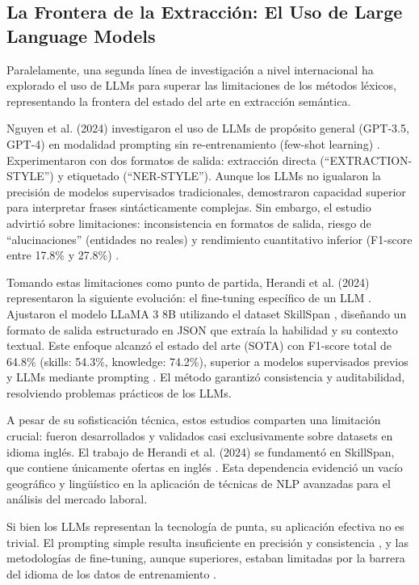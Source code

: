 \subsection{La Frontera de la Extracción: El Uso de Large Language Models}

Paralelamente, una segunda línea de investigación a nivel internacional ha explorado el uso de LLMs para superar las limitaciones de los métodos léxicos, representando la frontera del estado del arte en extracción semántica.

Nguyen et al. (2024) investigaron el uso de LLMs de propósito general (GPT-3.5, GPT-4) en modalidad prompting sin re-entrenamiento (few-shot learning) \cite{nguyen2024}. Experimentaron con dos formatos de salida: extracción directa (``EXTRACTION-STYLE'') y etiquetado (``NER-STYLE''). Aunque los LLMs no igualaron la precisión de modelos supervisados tradicionales, demostraron capacidad superior para interpretar frases sintácticamente complejas. Sin embargo, el estudio advirtió sobre limitaciones: inconsistencia en formatos de salida, riesgo de ``alucinaciones'' (entidades no reales) y rendimiento cuantitativo inferior (F1-score entre 17.8\% y 27.8\%) \cite{nguyen2024}.

Tomando estas limitaciones como punto de partida, Herandi et al. (2024) representaron la siguiente evolución: el fine-tuning específico de un LLM \cite{herandi2024}. Ajustaron el modelo LLaMA 3 8B utilizando el dataset SkillSpan \cite{zhang2022}, diseñando un formato de salida estructurado en JSON que extraía la habilidad y su contexto textual. Este enfoque alcanzó el estado del arte (SOTA) con F1-score total de 64.8\% (skills: 54.3\%, knowledge: 74.2\%), superior a modelos supervisados previos y LLMs mediante prompting \cite{herandi2024}. El método garantizó consistencia y auditabilidad, resolviendo problemas prácticos de los LLMs.

A pesar de su sofisticación técnica, estos estudios comparten una limitación crucial: fueron desarrollados y validados casi exclusivamente sobre datasets en idioma inglés. El trabajo de Herandi et al. (2024) se fundamentó en SkillSpan, que contiene únicamente ofertas en inglés \cite{herandi2024}. Esta dependencia evidenció un vacío geográfico y lingüístico en la aplicación de técnicas de NLP avanzadas para el análisis del mercado laboral.

Si bien los LLMs representan la tecnología de punta, su aplicación efectiva no es trivial. El prompting simple resulta insuficiente en precisión y consistencia \cite{nguyen2024}, y las metodologías de fine-tuning, aunque superiores, estaban limitadas por la barrera del idioma de los datos de entrenamiento \cite{herandi2024}.

